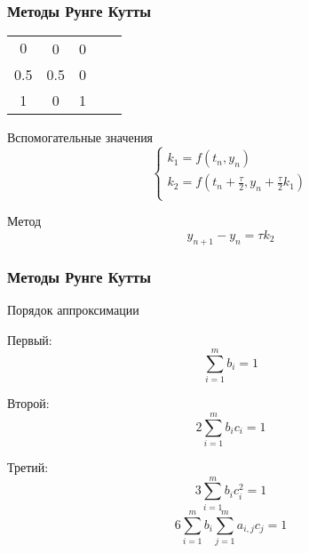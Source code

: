 \documentclass[10pt]{beamer}
\begin{document}
\begin{frame}[fragile]
\frametitle{Методы Рунге Кутты}

\begin{center}
\begin{tabular}{c|cccc}
$0$ & 0 & 0 \\
0.5 & 0.5 & 0 \\
\hline
1 & 0 & 1 \\
\end{tabular}

Вспомогательные значения
$$
\begin{cases}
k_1 = f(t_n, y_n)\\
k_2 = f(t_n + \frac{\tau}{2}, y_n  + \frac{\tau}{2} k_1) \\
\end{cases}
$$

Метод
$$
y_{n+1} - y_n = \tau k_2
$$
\end{center}

\end{frame}


\begin{frame}[fragile]
\frametitle{Методы Рунге Кутты}

Порядок аппроксимации

Первый: $$\sum_{i=1}^{m} b_i = 1$$

Второй: $$2 \sum_{i=1}^{m} b_i c_i = 1$$

Третий: $$3 \sum_{i=1}^{m} b_i c_i^2 = 1$$  
$$6 \sum_{i=1}^{m} b_i \sum_{j=1}^{m} a_{i, j} c_j = 1$$

\end{frame}
\end{document}
